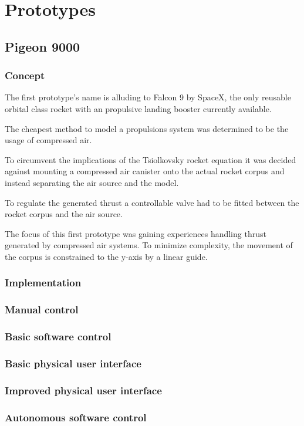 \chapter{Prototypes}

\section{Pigeon 9000}

\subsection{Concept}
The first prototype's name is alluding to Falcon 9 by SpaceX, the only reusable orbital class rocket with an propulsive landing booster currently available. 

The cheapest method to model a propulsions system was determined to be the usage of compressed air. 

To circumvent the implications of the Tsiolkovsky rocket equation it was decided against mounting a compressed air canister onto the actual rocket corpus and instead separating the air source and the model.

To regulate the generated thrust a controllable valve had to be fitted between the rocket corpus and the air source. 

The focus of this first prototype was gaining experiences handling thrust generated by compressed air systems. To minimize complexity, the movement of the corpus is constrained to the y-axis by a linear guide.

\subsection{Implementation}


\subsection{Manual control}


\subsection{Basic software control}


\subsection{Basic physical user interface}


\subsection{Improved physical user interface}


\subsection{Autonomous software control}